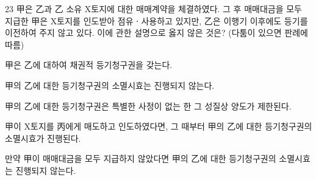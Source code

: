 \begin{question}{23}
甲은 乙과 乙 소유 X토지에 대한 매매계약을 체결하였다. 그 후 매매대금을 모두 지급한 甲은 X토지를 인도받아 점유ㆍ사용하고 있지만, 乙은 이행기 이후에도 등기를 이전하여 주지 않고 있다. 이에 관한 설명으로 옳지 않은 것은? (다툼이 있으면 판례에 따름)
\begin{choices}
  \item 甲은 乙에 대하여 채권적 등기청구권을 갖는다.
  \item 甲의 乙에 대한 등기청구권의 소멸시효는 진행되지 않는다.
  \item 甲의 乙에 대한 등기청구권은 특별한 사정이 없는 한 그 성질상 양도가 제한된다.
  \item 甲이 X토지를 丙에게 매도하고 인도하였다면, 그 때부터 甲의 乙에 대한 등기청구권의 소멸시효가 진행된다.
  \item 만약 甲이 매매대금을 모두 지급하지 않았다면 甲의 乙에 대한 등기청구권의 소멸시효는 진행되지 않는다.
\end{choices}
\end{question}
